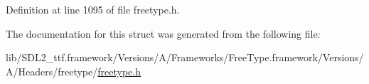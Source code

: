 Definition at line 1095 of file freetype.\+h.



The documentation for this struct was generated from the following file\+:\begin{DoxyCompactItemize}
\item 
lib/\+S\+D\+L2\+\_\+ttf.\+framework/\+Versions/\+A/\+Frameworks/\+Free\+Type.\+framework/\+Versions/\+A/\+Headers/freetype/\mbox{\hyperlink{freetype_8h}{freetype.\+h}}\end{DoxyCompactItemize}
